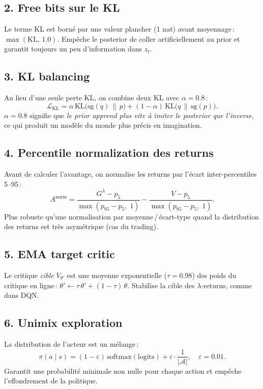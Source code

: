 \documentclass[11pt,a4paper]{article}
\begin{document}
\subsection{2. Free bits sur le KL}
Le terme KL est borné par une valeur plancher (1 nat) avant moyennage\,:
\(\max(\text{KL},\,1.0)\). Empêche le posterior de coller artificiellement
au prior et garantit toujours un peu d'information dans \(z_t\).

\subsection{3. KL balancing}
Au lieu d'une seule perte KL, on combine deux KL avec
\(\alpha=0.8\)\,:
\begin{equation}
\mathcal{L}_{\text{KL}} = \alpha\,\mathrm{KL}\bigl(\text{sg}(q)\,\|\,p\bigr)
                       + (1-\alpha)\,\mathrm{KL}\bigl(q\,\|\,\text{sg}(p)\bigr).
\end{equation}
\(\alpha=0.8\) signifie que \emph{le prior apprend plus vite à imiter le
posterior que l'inverse}, ce qui produit un modèle du monde plus précis
en imagination.

\subsection{4. Percentile normalization des returns}
Avant de calculer l'avantage, on normalise les returns par l'écart
inter-percentiles 5--95\,:
\begin{equation}
A^{\text{norm}} = \frac{G^\lambda - p_5}{\max(p_{95}-p_5,\;1)} -
                  \frac{V - p_5}{\max(p_{95}-p_5,\;1)}.
\end{equation}
Plus robuste qu'une normalisation par moyenne\,/\,écart-type quand la
distribution des returns est très asymétrique (cas du trading).

\subsection{5. EMA target critic}
Le critique \emph{cible} \(V_{\theta'}\) est une moyenne exponentielle
(\(\tau=0.98\)) des poids du critique en ligne\,:
\(\theta' \leftarrow \tau\,\theta' + (1-\tau)\,\theta\). Stabilise la cible
des \(\lambda\)-returns, comme dans DQN.

\subsection{6. Unimix exploration}
La distribution de l'acteur est un mélange\,:
\begin{equation}
\pi(a\mid s) = (1-\varepsilon)\,\mathrm{softmax}(\text{logits})
             + \varepsilon\cdot\frac{1}{|\mathcal{A}|},\quad \varepsilon = 0.01.
\end{equation}
Garantit une probabilité minimale non nulle pour chaque action et empêche
l'effondrement de la politique.
\end{document}
